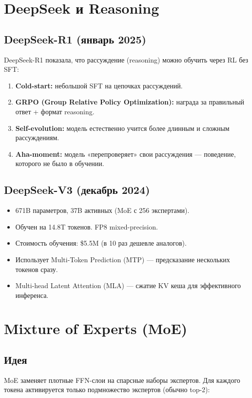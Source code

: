 \documentclass[a4paper,12pt]{article}
\begin{document}
\section{DeepSeek и Reasoning}

\subsection{DeepSeek-R1 (январь 2025)}
DeepSeek-R1 показала, что рассуждение (reasoning) можно обучить через RL без SFT:

\begin{enumerate}
    \item \textbf{Cold-start:} небольшой SFT на цепочках рассуждений.
    \item \textbf{GRPO (Group Relative Policy Optimization):} награда за правильный ответ + формат reasoning.
    \item \textbf{Self-evolution:} модель естественно учится более длинным и сложным рассуждениям.
    \item \textbf{Aha-moment:} модель «перепроверяет» свои рассуждения --- поведение, которого не было в обучении.
\end{enumerate}

\subsection{DeepSeek-V3 (декабрь 2024)}
\begin{itemize}
    \item 671B параметров, 37B активных (MoE с 256 экспертами).
    \item Обучен на 14.8T токенов. FP8 mixed-precision.
    \item Стоимость обучения: \$5.5M (в 10 раз дешевле аналогов).
    \item Использует Multi-Token Prediction (MTP) --- предсказание нескольких токенов сразу.
    \item Multi-head Latent Attention (MLA) --- сжатие KV кеша для эффективного инференса.
\end{itemize}

\section{Mixture of Experts (MoE)}

\subsection{Идея}
MoE заменяет плотные FFN-слои на спарсные наборы экспертов. Для каждого токена активируется только подмножество экспертов (обычно top-2):
\end{document}
